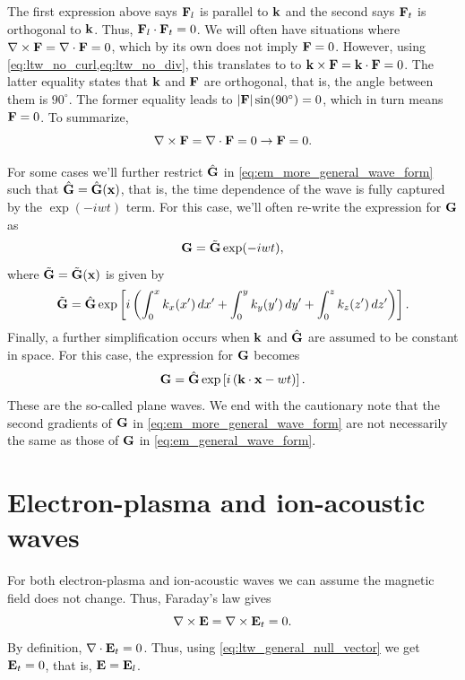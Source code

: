 \documentclass[a4paper,11pt]{report}
\begin{document}
The first expression above says $\mathbf{F}_l$ is parallel to $\mathbf{k}$ and the second says $\mathbf{F}_t$ is orthogonal to $\mathbf{k}$. Thus, $\mathbf{F}_l \cdot \mathbf{F}_t = 0$. We will often have situations where $\nabla \times \mathbf{F} = \nabla \cdot \mathbf{F} = 0$, which by its own does not imply $\mathbf{F} = 0$. However, using \cref{eq:ltw_no_curl,eq:ltw_no_div}, this translates to to $\mathbf{k} \times \mathbf{F} = \mathbf{k} \cdot \mathbf{F} =  0$. The latter equality states that $\mathbf{k}$ and $\mathbf{F}$ are orthogonal, that is, the angle between them is $90^\circ$. The former equality leads to $|\mathbf{F}| \sin(90^\circ) = 0$, which in turn means $\mathbf{F} = 0$. To summarize,
\begin{equation}
    \label{eq:ltw_general_null_vector}
    \nabla \times \mathbf{F} = \nabla \cdot \mathbf{F} = 0 \to \mathbf{F} = 0.
\end{equation}

For some cases we'll further restrict $\hat{\mathbf{G}}$ in \cref{eq:em_more_general_wave_form} such that $\hat{\mathbf{G}} = \hat{\mathbf{G}} (\mathbf{x})$, that is, the time dependence of the wave is fully captured by the $\exp(-iwt)$ term. For this case, we'll often re-write the expression for $\mathbf{G}$ as
\begin{equation}
    \label{eq:em_semi_general_wave_form}
    \mathbf{G} = \tilde{\mathbf{G}} \exp (-iwt),
\end{equation}
where $\tilde{\mathbf{G}} = \tilde{\mathbf{G}}(\mathbf{x})$ is given by
\begin{equation}
    \tilde{\mathbf{G}} = \hat{\mathbf{G}} \exp \left [ i \left ( \int_0^x k_x(x') \, dx' + \int_0^y k_y(y') \, dy' + \int_0^z k_z(z') \, dz' \right ) \right ].
\end{equation}
Finally, a further simplification occurs when $\mathbf{k}$ and $\hat{\mathbf{G}}$ are assumed to be constant in space. For this case, the expression for $\mathbf{G}$ becomes
\begin{equation}
    \label{eq:em_general_wave_form}
    \mathbf{G} = \hat{\mathbf{G}} \exp \left [i\left ( \mathbf{k} \cdot \mathbf{x} - wt \right ) \right ].
\end{equation}
These are the so-called plane waves. We end with the cautionary note that the second gradients of $\mathbf{G}$ in \cref{eq:em_more_general_wave_form} are not necessarily the same as those of $\mathbf{G}$ in \cref{eq:em_general_wave_form}.

\section{Electron-plasma and ion-acoustic waves}
For both electron-plasma and ion-acoustic waves we can assume the magnetic field does not change. Thus, Faraday's law gives
\begin{equation}
    \nabla \times \mathbf{E} = \nabla \times \mathbf{E}_t = 0.
\end{equation}
By definition, $\nabla \cdot \mathbf{E}_t = 0$. Thus, using \cref{eq:ltw_general_null_vector} we get $\mathbf{E}_t = 0$, that is, $\mathbf{E} = \mathbf{E}_l$. 
\end{document}
